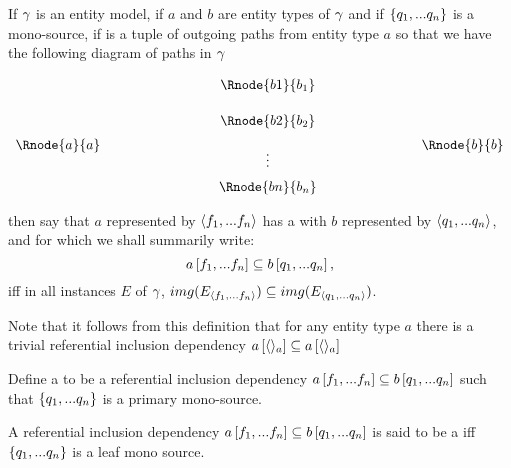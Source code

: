 \begin{definition}
If $\gamma$ is an entity model, 
if $a$ and $b$ are entity types of  $\gamma$ and  if $\left\{q_1,...q_n\right\}$
is a mono-source,
if \fntuple is a tuple of outgoing paths from entity type $a$  
so that we have the following diagram of paths in $\gamma$
\setlength{\arraycolsep}{.2cm}
\begin{center}
$
\begin{array}{cp{2cm}ccp{2cm}c}
             & &         & \Rnode{b1}{b_1} &&               \\ [0.5cm]
						 & &         & \Rnode{b2}{b_2} &&               \\ [0.2cm]
\Rnode{a}{a} & &         &                 &&  \Rnode{b}{b} \\ [-0.2cm]						
             & &         &    \vdots       &&               \\ [0.2cm]
             & &         & \Rnode{bn}{b_n} &&               \\ 
\end{array}
$
\end{center}
then say that $a$ represented by $\langle f_1,...f_n\rangle$ 
has a  with $b$ represented by $\langle q_1,...q_n\rangle$, and for which we shall summarily write:
$$
a\left[f_1,...f_n\right]\subseteq b\left[q_1,...q_n\right],
$$
iff in all instances $E$ of $\gamma$,
$img(E_{\langle f_1,...f_n\rangle}) \subseteq img(E_{\langle q_1,...q_n\rangle})$. 
\end{definition}

Note that it follows from this definition that for any entity type $a$ there is a trivial referential inclusion dependency $
a\left[\langle\rangle_a\right]\subseteq a\left[\langle\rangle_a\right]$

\begin{definition}
Define a  to be a
referential inclusion dependency $a\left[f_1,...f_n\right]\subseteq b\left[q_1,...q_n\right]$
such that $\left\{q_1,...q_n\right\}$ is a primary mono-source.
\end{definition}

\begin{definition} 
A referential inclusion dependency $a\left[f_1,...f_n\right]\subseteq b\left[q_1,...q_n\right]$ is said to be a  iff $\left\{q_1,...q_n\right\}$ is a leaf mono source.
\end{definition}

